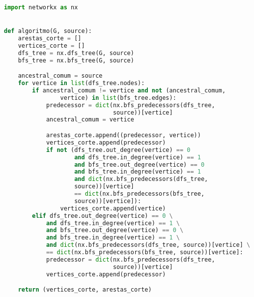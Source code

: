 \documentclass[
	12pt,
	openright,
	oneside,
	a4paper,
	english,
	french,
	spanish,
	brazil
	]{abntex2}
\begin{document}
\frenchspacing
\imprimircapa
\imprimirfolhaderosto

\begin{lstlisting}[language=Python]
import networkx as nx


def algoritmo(G, source):
	arestas_corte = []
	vertices_corte = []
	dfs_tree = nx.dfs_tree(G, source)
	bfs_tree = nx.bfs_tree(G, source)

	ancestral_comum = source
	for vertice in list(dfs_tree.nodes):
		if ancestral_comum != vertice and not (ancestral_comum,
				vertice) in list(bfs_tree.edges):
			predecessor = dict(nx.bfs_predecessors(dfs_tree,
							   source))[vertice]
			ancestral_comum = vertice

			arestas_corte.append((predecessor, vertice))
			vertices_corte.append(predecessor)
			if not (dfs_tree.out_degree(vertice) == 0
					and dfs_tree.in_degree(vertice) == 1
					and bfs_tree.out_degree(vertice) == 0
					and bfs_tree.in_degree(vertice) == 1
					and dict(nx.bfs_predecessors(dfs_tree,
					source))[vertice]
					== dict(nx.bfs_predecessors(bfs_tree,
					source))[vertice]):
				vertices_corte.append(vertice)
		elif dfs_tree.out_degree(vertice) == 0 \
			and dfs_tree.in_degree(vertice) == 1 \
			and bfs_tree.out_degree(vertice) == 0 \
			and bfs_tree.in_degree(vertice) == 1 \
			and dict(nx.bfs_predecessors(dfs_tree, source))[vertice] \
			== dict(nx.bfs_predecessors(bfs_tree, source))[vertice]:
			predecessor = dict(nx.bfs_predecessors(dfs_tree,
							   source))[vertice]
			vertices_corte.append(predecessor)

	return (vertices_corte, arestas_corte)
\end{lstlisting}

\end{document}
